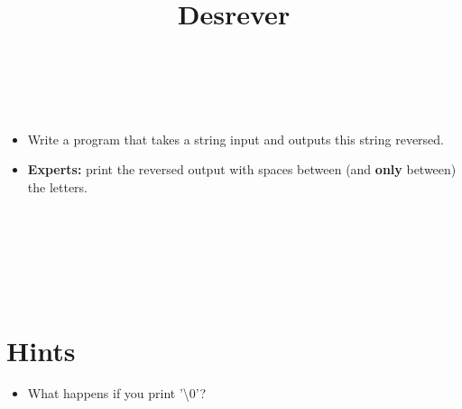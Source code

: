 


\title{Desrever} %
\author{} %
\renewcommand{\difficulty}{Hard} %
\renewcommand{\requirements}{Strings, Arrays} %
\renewcommand{\aims}{iterating through C-Strings} %


 \maketitle
 \taskinfos

\ \\\ \\
\begin{itemize}
	\item Write a program that takes a string input and outputs this string reversed.
	\item \textbf{Experts:} print the reversed output with spaces between (and \textbf{only} between) the letters.
\end{itemize}	
 
 
\ \\\ \\\ \\\ \\\ \\
\section*{Hints}
	\begin{itemize}
		\item What happens if you print '\textbackslash0'?
	\end{itemize}
 

